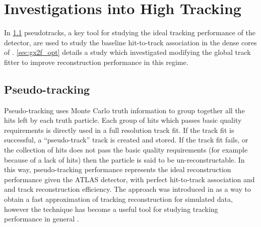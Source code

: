 \section{Investigations into High \texorpdfstring{\pT}{pT} \bhadron Tracking}\label{sec:b_track_reco_improvements}

In \cref{sec:pseudotracks} pseudotracks, a key tool for studying the ideal tracking performance of the \ATLAS detector, are used to study the baseline hit-to-track association in the dense cores of \highpt \bjets.
\cref{sec:gx2f_opt} details a study which investigated modifying the global track fitter to improve reconstruction performance in this regime.


\subsection{Pseudo-tracking}\label{sec:pseudotracks}

Pseudo-tracking uses Monte Carlo truth information to group together all the hits left by each truth particle.
Each group of hits which passes basic quality requirements is directly used in a full resolution track fit.
If the track fit is successful, a ``pseudo-track'' track is created and stored.
If the track fit fails, or the collection of hits does not pass the basic quality requirements (for example because of a lack of hits) then the particle is said to be un-reconstructable.
In this way, pseudo-tracking performance represents the ideal reconstruction performance given the ATLAS detector, with perfect hit-to-track association and and track reconstruction efficiency.
The approach was introduced in \cite{Jansky:2013ryb} as a way to obtain a fast approximation of tracking reconstruction for simulated data, however the technique has become a useful tool for studying tracking performance in general \cite{ATL-PHYS-PUB-2015-006}.

